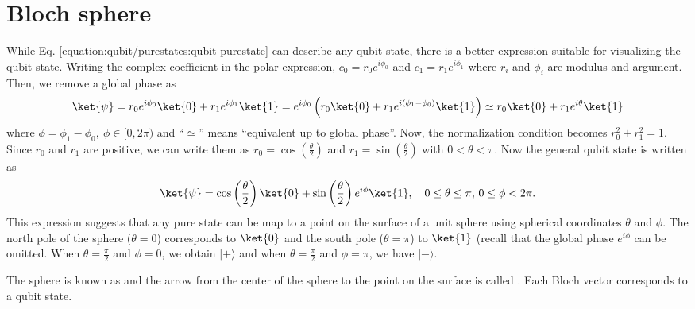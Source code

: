 \documentclass[letterpaper,10pt,english]{jupyterBook}
\begin{document}
\section{Bloch sphere}
\label{\detokenize{qubit/bloch:bloch-sphere}}\label{\detokenize{qubit/bloch:sec-bloch}}\label{\detokenize{qubit/bloch::doc}}
\sphinxAtStartPar
While Eq. \eqref{equation:qubit/purestates:qubit-purestate} can describe any qubit state, there is a better expression suitable for visualizing the qubit state.
Writing the complex coefficient in the polar expression,
\(c_0 = r_0 e^{i \phi_0}\) and \(c_1 = r_1 e^{i \phi_1}\) where \(r_i\) and \(\phi_i\) are modulus and argument. Then, we remove a global phase as
\begin{equation*}
\begin{split}
\ket{\psi} = r_0 e^{i \phi_0} \ket{0} + r_1 e^{i \phi_1} \ket{1} = e^{i \phi_0} \left( r_0  \ket{0} + r_1 e^{i (\phi_1-\phi_0)} \ket{1} \right) \simeq r_0  \ket{0} + r_1 e^{i \theta} \ket{1}
\end{split}
\end{equation*}
\sphinxAtStartPar
where \(\phi=\phi_1-\phi_0,\ \phi \in [0, 2\pi)\) and “\(\simeq\)” means “equivalent up to global phase”.  Now, the normalization condition becomes \(r_0^2 + r_1^2 = 1\).  Since \(r_0\) and \(r_1\) are positive, we can write them as \(r_0 = \cos\left(\frac{\theta}{2}\right)\) and \(r_1 = \sin\left(\frac{\theta}{2}\right)\) with \(0 < \theta < \pi\).  Now the general qubit state is written as
\begin{equation}\label{equation:qubit/bloch:bloch-vector}
\begin{split}
\ket{\psi} = \cos\left(\frac{\theta}{2}\right) \ket{0} + \sin\left(\frac{\theta}{2}\right) e^{i \phi} \ket{1},\quad 0 \le \theta \le \pi, \, 0 \le \phi < 2 \pi .
\end{split}
\end{equation}
\sphinxAtStartPar
This expression suggests that any pure state can be map to a point on the surface of a unit sphere using spherical coordinates \(\theta\) and \(\phi\).   The north pole of the sphere (\(\theta=0\)) corresponds to \(\ket{0}\) and the south pole (\(\theta=\pi\)) to \(\ket{1}\) (recall that the global phase \(e^{i \phi}\) can be omitted.  When \(\theta = \frac{\pi}{2}\) and \(\phi=0\), we obtain \(|+\rangle\) and when \(\theta = \frac{\pi}{2}\) and \(\phi=\pi\), we have \(|-\rangle\).

\sphinxAtStartPar
The sphere is known as  and the arrow from the center of the sphere to the point on the surface is called . Each Bloch vector corresponds to a qubit state.
\end{document}
